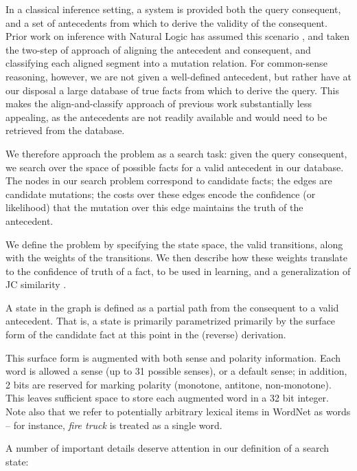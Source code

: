 In a classical inference setting, a system is provided both the
  query consequent, and a set of antecedents from which to derive
  the validity of the consequent.
Prior work on inference with Natural Logic has assumed this scenario
  \cite{key:2008maccartney-natlog}, and taken the two-step of approach
  of aligning the antecedent and consequent, and classifying each
  aligned segment into a mutation relation.
For common-sense reasoning, however, we are not given a well-defined
  antecedent, but rather have at our disposal a large database of
  true facts from which to derive the query.
This makes the align-and-classify approach of previous work substantially
  less appealing, as the antecedents are not readily available and would
  need to be retrieved from the database.

We therefore approach the problem as a search task: given the
  query consequent, we search over the space of possible facts for
  a valid antecedent in our database.
The nodes in our search problem correspond to candidate facts; the
  edges are candidate mutations; the costs over these edges encode
  the confidence (or likelihood) that the mutation over this edge
  maintains the truth of the antecedent.

We define the problem by specifying the state space,
  the valid transitions, along with the weights of
  the transitions.
We then describe how these weights translate to the confidence of truth
  of a fact, to be used in learning, and a generalization of
  JC similarity \cite{key:1997jc-similarity}.

%
%
A state in the graph is defined as a partial path from the consequent to a
  valid antecedent.
That is, a state is primarily parametrized primarily by the surface
  form of the candidate fact at this point in the (reverse) derivation.

This surface form is augmented with both sense and polarity
  information.
Each word is allowed a sense (up to 31 possible senses), or a default
  sense; in addition, 2 bits are reserved for marking polarity
  (monotone, antitone, non-monotone).
This leaves sufficient space to store each augmented word in a 32 bit
  integer.
Note also that we refer to potentially arbitrary lexical items in
  WordNet as words -- for instance, \textit{fire truck} is treated as
  a single word.

A number of important details deserve attention in our definition of
  a search state:


